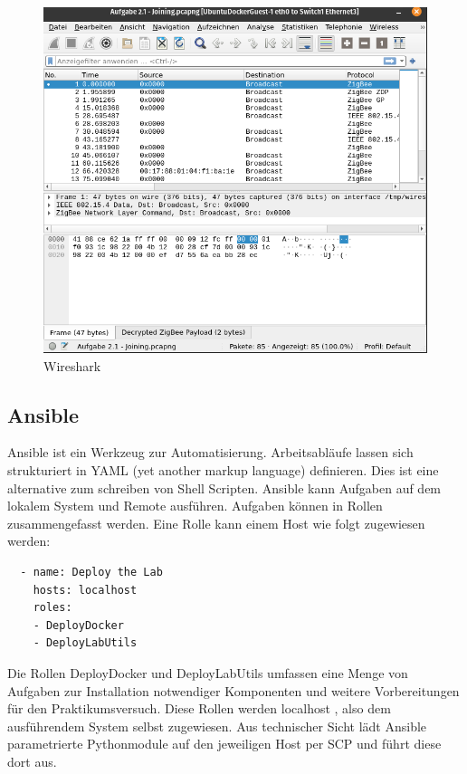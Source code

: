 \begin{figure}[H]
  \centering
  \includegraphics[width=1\textwidth]{media/wireshark.png}
  \caption{Wireshark}
\end{figure}

\subsection{Ansible}

Ansible ist ein Werkzeug zur Automatisierung. Arbeitsabläufe lassen sich strukturiert in YAML (yet another markup language) definieren. Dies ist eine alternative zum schreiben
von Shell Scripten. Ansible kann Aufgaben auf dem lokalem System und Remote ausführen. Aufgaben können in Rollen zusammengefasst werden.  
Eine Rolle kann einem Host wie folgt zugewiesen werden:
\begin{lstlisting}
  - name: Deploy the Lab
    hosts: localhost
    roles:
    - DeployDocker
    - DeployLabUtils
\end{lstlisting}

Die Rollen \grqq DeployDocker\grqq{} und \grqq DeployLabUtils\grqq{} umfassen eine Menge von Aufgaben zur Installation notwendiger Komponenten und weitere Vorbereitungen
für den Praktikumsversuch. Diese Rollen werden \grqq localhost \grqq{}, also dem ausführendem System selbst zugewiesen.
Aus technischer Sicht lädt Ansible parametrierte Pythonmodule auf den jeweiligen Host per SCP und führt diese dort aus.


